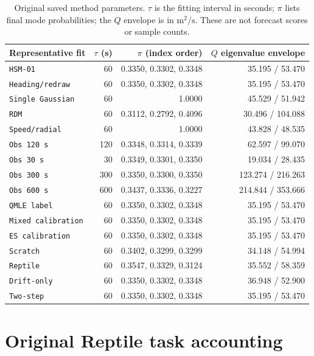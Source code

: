 \begin{table}[htbp]
\centering\footnotesize
\caption{Original saved method parameters. $\tau$ is the fitting interval
in seconds; $\pi$ lists final mode probabilities; the $Q$ envelope is in
$\mathrm{m}^2/\mathrm{s}$. These are not forecast scores or sample counts.}
\label{tab:method-noise-parameters}\hypertarget{tab:method-noise-parameters}{}
\begin{tabular}{lrrr}
\toprule
Representative fit & $\tau$ (s) & $\pi$ (index order) & $Q$ eigenvalue envelope\\
\midrule
\texttt{HSM-01} & 60 & 0.3350, 0.3302, 0.3348 & 35.195 / 53.470\\
\texttt{Heading/redraw} & 60 & 0.3350, 0.3302, 0.3348 & 35.195 / 53.470\\
\texttt{Single Gaussian} & 60 & 1.0000 & 45.529 / 51.942\\
\texttt{RDM} & 60 & 0.3112, 0.2792, 0.4096 & 30.496 / 104.088\\
\texttt{Speed/radial} & 60 & 1.0000 & 43.828 / 48.535\\
\texttt{Obs 120 s} & 120 & 0.3348, 0.3314, 0.3339 & 62.597 / 99.070\\
\texttt{Obs 30 s} & 30 & 0.3349, 0.3301, 0.3350 & 19.034 / 28.435\\
\texttt{Obs 300 s} & 300 & 0.3350, 0.3300, 0.3350 & 123.274 / 216.263\\
\texttt{Obs 600 s} & 600 & 0.3437, 0.3336, 0.3227 & 214.844 / 353.666\\
\texttt{QMLE label} & 60 & 0.3350, 0.3302, 0.3348 & 35.195 / 53.470\\
\texttt{Mixed calibration} & 60 & 0.3350, 0.3302, 0.3348 & 35.195 / 53.470\\
\texttt{ES calibration} & 60 & 0.3350, 0.3302, 0.3348 & 35.195 / 53.470\\
\texttt{Scratch} & 60 & 0.3402, 0.3299, 0.3299 & 34.148 / 54.994\\
\texttt{Reptile} & 60 & 0.3547, 0.3329, 0.3124 & 35.552 / 58.359\\
\texttt{Drift-only} & 60 & 0.3350, 0.3302, 0.3348 & 36.948 / 52.900\\
\texttt{Two-step} & 60 & 0.3350, 0.3302, 0.3348 & 35.195 / 53.470\\
\bottomrule
\end{tabular}
\end{table}


\section{Original Reptile task accounting}
\label{sec:reptile-task-accounting}\hypertarget{sec:reptile-task-accounting}{}

